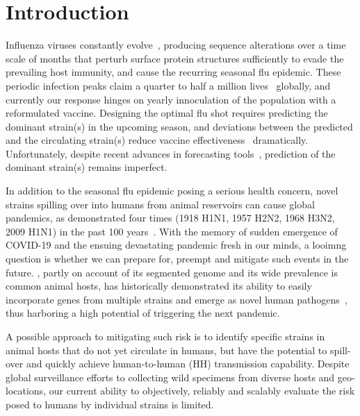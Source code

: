 \documentclass[onecolumn, compsoc,10pt]{IEEEtran}
\begin{document}
\vspace{10pt}
\section*{Introduction}

Influenza viruses constantly evolve~\cite{dos2016influenza},  producing  sequence alterations over a time scale of months  that  perturb surface protein structures sufficiently to evade the prevailing host immunity, and cause the  recurring seasonal flu epidemic. These periodic  infection peaks claim a quarter to half a million lives~\cite{huddleston2020integrating} globally,  and currently our response hinges on  yearly innoculation of the  population with a  reformulated  vaccine.  Designing the optimal flu shot requires predicting the dominant  strain(s)  in the upcoming season, and deviations between the predicted and the circulating strain(s)  reduce  vaccine effectiveness~\cite{tricco2013comparing} dramatically. Unfortunately,  despite  recent advances in forecasting tools~\cite{neher2014predicting,huddleston2020integrating}, prediction of the dominant strain(s) remains imperfect. 



In addition to  the seasonal flu epidemic posing a serious health concern, novel \infl strains spilling over into humans from animal reservoirs can cause global pandemics, as demonstrated four times (1918 H1N1, 1957 H2N2, 1968 H3N2, 2009 H1N1) in the past 100 years~\cite{shao2017evolution}. With the memory of sudden emergence of   COVID-19 and the ensuing devastating pandemic fresh in our minds, a looimng question  is whether we can prepare for, preempt and mitigate such events in the future.  \infl,  partly on account of its segmented genome and its wide prevalence is common animal hosts, has historically demonstrated its ability to easily incorporate genes from multiple strains and emerge as novel human pathogens~\cite{reid2003origin,vergara2014ns},  thus harboring  a high potential  of triggering the next  pandemic.

A possible approach to mitigating such risk is to identify specific strains in animal hosts that do not yet circulate in humans, but have the potential to spill-over and quickly achieve human-to-human (HH) transmission capability. Despite global surveillance efforts to  collecting wild specimens from diverse hosts and geo-locations, our  current ability to objectively, reliably and scalably  evaluate the risk posed to  humans by  individual strains  is limited.
\end{document}
